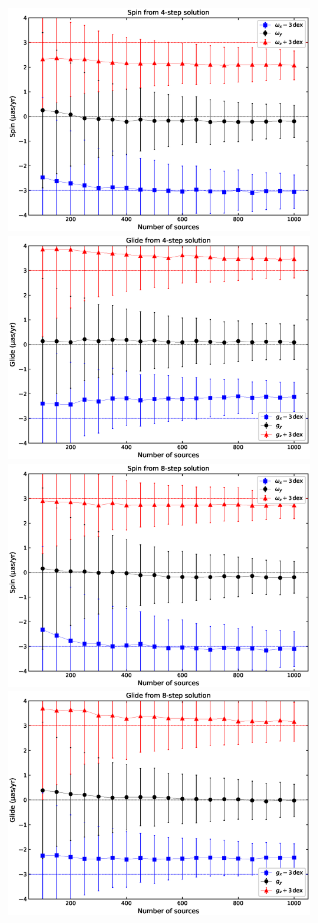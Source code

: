 \documentclass{aa-note}    %
\begin{document}
 \begin{figure}[hbtp]
   \centering
   \includegraphics[width=80mm]{figs/spin-from-apm-nju-4step} 
   \includegraphics[width=80mm]{figs/glide-from-apm-nju-4step} \\
   \includegraphics[width=80mm]{figs/spin-from-apm-nju-8step} 
   \includegraphics[width=80mm]{figs/glide-from-apm-nju-8step} \\

\end{figure}
\end{document}
